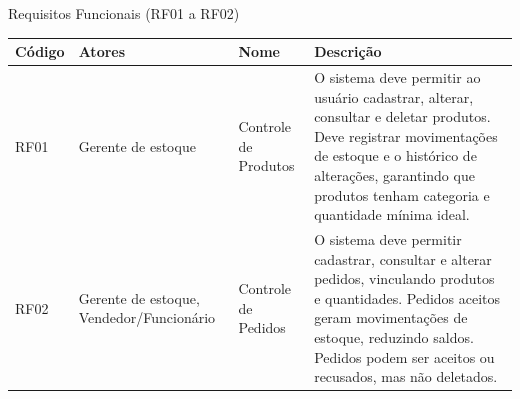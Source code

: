 \documentclass[
	12pt,				%
	openany,			%
	twoside,			%
	a4paper,			%
	english,			%
	brazil				%
	]{abntex2}
\begin{document}
\begin{quadro}[htb]
\caption{\label{quadro_rf1}Requisitos Funcionais (RF01 a RF02)}
\hspace*{-1cm}
\begin{tabular}{|p{1.4cm}|p{2.8cm}|p{4.5cm}|p{7.0cm}|}
    \hline
    \textbf{Código} & \textbf{Atores} & \textbf{Nome} & \textbf{Descrição} \\ \hline

  RF01 & Gerente de estoque & Controle de Produtos & O sistema deve permitir ao usuário cadastrar, alterar, consultar e deletar produtos. Deve registrar movimentações de estoque e o histórico de alterações, garantindo que produtos tenham categoria e quantidade mínima ideal. \\ \hline

  RF02 & Gerente de estoque, Vendedor/Funcionário & Controle de Pedidos & O sistema deve permitir cadastrar, consultar e alterar pedidos, vinculando produtos e quantidades. Pedidos aceitos geram movimentações de estoque, reduzindo saldos. Pedidos podem ser aceitos ou recusados, mas não deletados. \\ \hline

   

   

    


\end{tabular}
\end{quadro}
\end{document}
